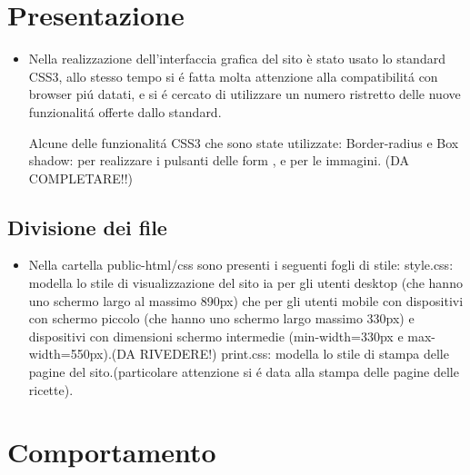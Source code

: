\documentclass[12pt]{article}
\begin{document}
			\section{Presentazione}
			\begin{itemize}
				\item Nella realizzazione dell'interfaccia grafica del sito è stato usato lo standard CSS3, allo stesso tempo si \'e fatta molta attenzione alla compatibilit\'a con browser pi\'u datati, e si \'e cercato di utilizzare un numero ristretto delle nuove funzionalit\'a offerte dallo standard.
				
				Alcune delle funzionalit\'a CSS3 che sono state utilizzate:
				Border-radius e Box shadow: per realizzare i pulsanti delle form , e per le immagini.
				(DA COMPLETARE!!)
				
			\end{itemize}
			\subsection{Divisione dei file}
			\begin{itemize}
				\item Nella cartella public-html/css sono presenti i seguenti fogli di stile:
				style.css: modella lo stile di visualizzazione del sito ia per gli utenti desktop (che hanno uno schermo largo al massimo 890px) che per gli utenti mobile con dispositivi con schermo piccolo (che hanno uno schermo largo massimo 330px) e dispositivi con dimensioni schermo intermedie (min-width=330px e max-width=550px).(DA RIVEDERE!)
				print.css: modella lo stile di stampa delle pagine del sito.(particolare attenzione si \'e data alla stampa delle pagine delle ricette).
				\end{itemize}
			\section{Comportamento}
			
			
			
			
				
		
	
	
\end{document}
